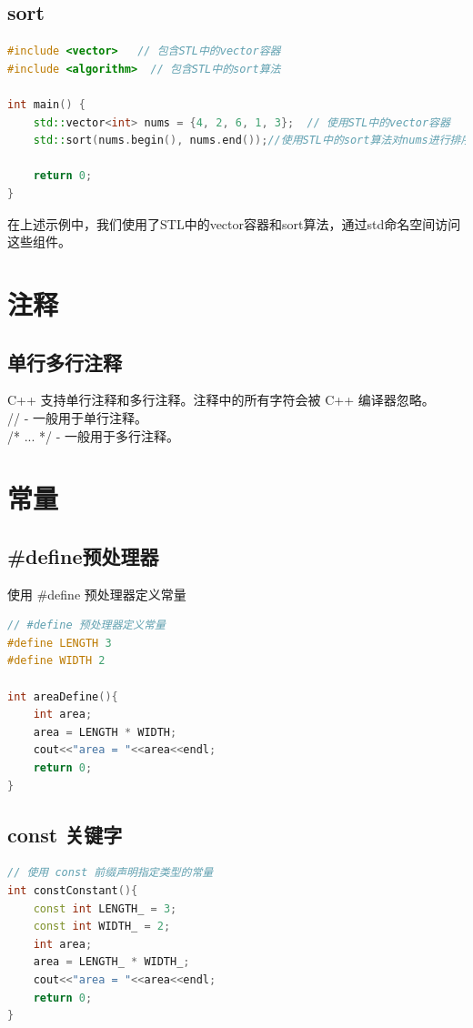 \documentclass[12pt,twiside,a4paper]{ctexbook}
\numberwithin{chapter}{part}
\begin{document}
\section{sort}
\begin{lstlisting}[language=C++]
#include <vector>   // 包含STL中的vector容器
#include <algorithm>  // 包含STL中的sort算法

int main() {
    std::vector<int> nums = {4, 2, 6, 1, 3};  // 使用STL中的vector容器
    std::sort(nums.begin(), nums.end());//使用STL中的sort算法对nums进行排序

    return 0;
}
\end{lstlisting}
在上述示例中，我们使用了STL中的vector容器和sort算法，通过std命名空间访问这些组件。

\chapter{注释}
\section{单行多行注释}
C++ 支持单行注释和多行注释。注释中的所有字符会被 C++ 编译器忽略。\\
// - 一般用于单行注释。\\
/* ... */ - 一般用于多行注释。

\chapter{常量}
\section{\#define预处理器}
使用 \#define 预处理器定义常量
\begin{lstlisting}[language=C++]
// #define 预处理器定义常量
#define LENGTH 3
#define WIDTH 2

int areaDefine(){
	int area;
	area = LENGTH * WIDTH;
	cout<<"area = "<<area<<endl;
	return 0;
}
\end{lstlisting}

\section{const 关键字}
\begin{lstlisting}[language=C++]
// 使用 const 前缀声明指定类型的常量
int constConstant(){
	const int LENGTH_ = 3;
	const int WIDTH_ = 2;
	int area;
	area = LENGTH_ * WIDTH_;
	cout<<"area = "<<area<<endl; 
	return 0;
}
\end{lstlisting}
\end{document}
